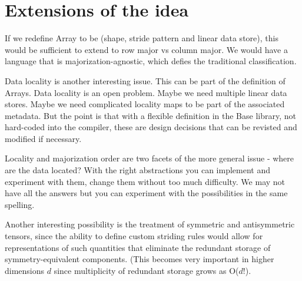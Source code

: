 \documentclass[preprint]{sigplanconf}
\begin{document}
\section{Extensions of the idea}

If we redefine Array to be (shape, stride pattern and linear data
store), this would be sufficient to extend to row major vs column
major. We would have a language that is majorization-agnostic, which
defies the traditional classification.

Data locality is another interesting issue. This can be part of the definition
of Arrays. Data locality is an open problem. Maybe we need multiple linear data stores. Maybe we need complicated locality maps to be part of the associated metadata. But the point is that with a flexible definition in the Base library, not hard-coded into the compiler, these are design decisions that can be revisted and modified if necessary.

Locality and majorization order are two facets of the more general issue - where are the data located? With the right abstractions you can implement and experiment with them, change them without too much difficulty. We may not have all the answers but you can experiment with the possibilities in the same spelling.

Another interesting possibility is the treatment of symmetric and antisymmetric
tensors, since the ability to define custom striding rules would allow for
representations of such quantities that eliminate the redundant storage of
symmetry-equivalent components. (This becomes very important in higher
dimensions $d$ since multiplicity of redundant storage grows as O($d!$).


\end{document}
